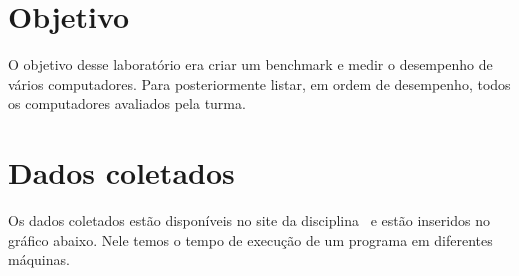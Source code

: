 \documentclass[10pt,a4paper]{article}
\begin{document}
\setlength{\parskip}{0pt}
\setlength{\parsep}{0pt}
\setlength{\headsep}{0pt}
\setlength{\topskip}{0pt}
\setlength{\topmargin}{0pt}
\setlength{\topsep}{0pt}
\setlength{\partopsep}{0pt}


\begin{minipage}{5cm}
  \vspace{2mm}
\end{minipage}


\section{Objetivo}
O objetivo desse laboratório era criar um benchmark e medir o desempenho de vários computadores.
Para posteriormente listar, em ordem de desempenho, todos os computadores avaliados pela turma.
\section{Dados coletados}
Os dados coletados estão disponíveis no site da
disciplina~\cite{Dados} e estão inseridos no gráfico abaixo. Nele
temos o tempo de execução de um programa em diferentes máquinas.
\end{document}
